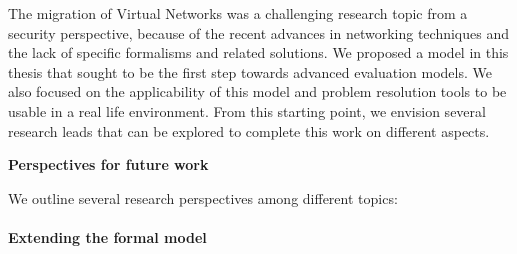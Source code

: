 The migration of Virtual Networks was a challenging research topic from a security perspective, because of the recent advances in networking techniques and the lack of specific formalisms and related solutions. We proposed a model in this thesis that sought to be the first step towards advanced evaluation models. We also focused on the applicability of this model and problem resolution tools to be usable in a real life environment. From this starting point, we envision several research leads that can be explored to complete this work on different aspects.

\textbf{Perspectives for future work}

We outline several research perspectives among different topics: 

\paragraph{Extending the formal model}
